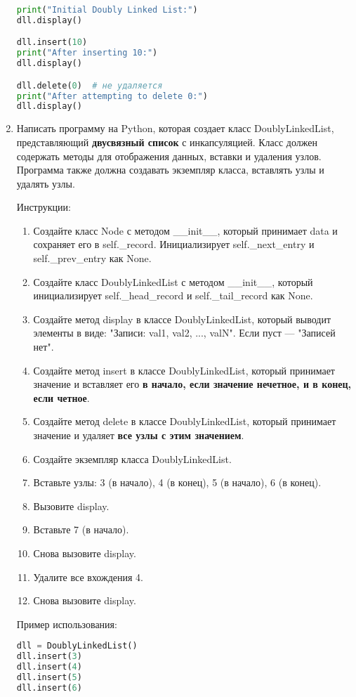 \begin{enumerate}
\begin{lstlisting}[language=Python]
print("Initial Doubly Linked List:")
dll.display()

dll.insert(10)
print("After inserting 10:")
dll.display()

dll.delete(0)  # не удаляется
print("After attempting to delete 0:")
dll.display()
\end{lstlisting}

\item Написать программу на Python, которая создает класс DoublyLinkedList, представляющий \textbf{двусвязный список} с инкапсуляцией. Класс должен содержать методы для отображения данных, вставки и удаления узлов. Программа также должна создавать экземпляр класса, вставлять узлы и удалять узлы.

Инструкции:
\begin{enumerate}
    \item Создайте класс Node с методом \_\_init\_\_, который принимает data и сохраняет его в self.\_record. Инициализирует self.\_next\_entry и self.\_prev\_entry как None.
    \item Создайте класс DoublyLinkedList с методом \_\_init\_\_, который инициализирует self.\_head\_record и self.\_tail\_record как None.
    \item Создайте метод display в классе DoublyLinkedList, который выводит элементы в виде: "Записи: val1, val2, ..., valN". Если пуст — "Записей нет".
    \item Создайте метод insert в классе DoublyLinkedList, который принимает значение и вставляет его \textbf{в начало, если значение нечетное, и в конец, если четное}.
    \item Создайте метод delete в классе DoublyLinkedList, который принимает значение и удаляет \textbf{все узлы с этим значением}.
    \item Создайте экземпляр класса DoublyLinkedList.
    \item Вставьте узлы: 3 (в начало), 4 (в конец), 5 (в начало), 6 (в конец).
    \item Вызовите display.
    \item Вставьте 7 (в начало).
    \item Снова вызовите display.
    \item Удалите все вхождения 4.
    \item Снова вызовите display.
\end{enumerate}

Пример использования:
\begin{lstlisting}[language=Python]
dll = DoublyLinkedList()
dll.insert(3)
dll.insert(4)
dll.insert(5)
dll.insert(6)


\end{lstlisting}
\end{enumerate}

